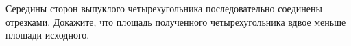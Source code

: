 \begin{ex}
	\begin{condition}
		Середины сторон выпуклого четырехугольника последовательно соединены отрезками. Докажите, что площадь полученного четырехугольника вдвое меньше площади исходного.
	\end{condition}
\end{ex}